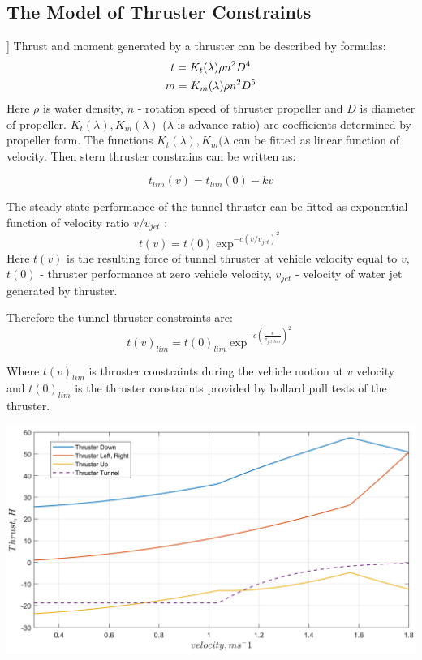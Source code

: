 \documentclass[a0,portrait]{a0poster}
\begin{document}
\begin{minipage}[t]{0.48\linewidth}
\begin{multicols}{2}
\section*{The Model of Thruster Constraints}
]
Thrust and moment generated by a thruster can be described by formulas:
\begin{gather}
	t = K_t({\lambda})\rho n^2 D^4\notag \\
	m = K_m({\lambda})\rho n^2 D^5\notag
\end{gather}
Here $\rho$ is water density, $n$ - rotation speed of thruster propeller and $D$ is diameter of propeller. $K_t({\lambda}), K_m({\lambda})$ ($\lambda$ is advance ratio) are coefficients determined by propeller form. The functions $K_t({\lambda}), K_m({\lambda}$ can be fitted as linear function of velocity. Then stern thruster constrains can be written as:

\begin{equation}
	t_{lim}(v) = t_{lim}(0) - kv
	\label{eq:constraints_1}
\end{equation}

The steady state performance of the tunnel thruster can be fitted as exponential function of velocity ratio $v/v_{jet}$ \cite{thruster_tunnel}:
\begin{equation*}
	t(v) = t(0)\exp^{-c(v/v_{jet})^2}
\end{equation*}
Here $t(v)$ is the resulting force of tunnel thruster at vehicle velocity equal to $v$, $t(0)$ - thruster performance at zero vehicle velocity, $v_{jet}$ - velocity of  water jet generated by thruster.

Therefore the tunnel thruster constraints are:
\begin{equation}
	t(v)_{lim} = t(0)_{lim}\exp^{-c(\frac{v}{v_{jet,lim}})^2}
\label{eq:constraints}
\end{equation}

Where $t(v)_{lim}$ is thruster constraints during the vehicle motion at $v$ velocity and $t(0)_{lim}$ is the thruster constraints provided by bollard pull tests of the thruster.
\end{multicols}

\includegraphics[width=\linewidth]{fig/Allocation_50My.png}
\label{plot}


\end{minipage}
\end{document}
